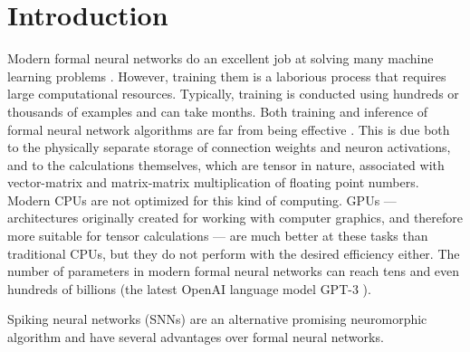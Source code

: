 \documentclass[a4paper]{article}
\begin{document}
\pagebreak

\section*{Introduction}

Modern formal neural networks do an excellent job at solving many machine learning problems \cite{pmlr-v28-wan13, Khan_2020}. However, training them is a laborious process that requires large computational resources. Typically, training is conducted using hundreds or thousands of examples and can take months. Both training and inference of formal neural network algorithms are far from being effective \cite{Edwards2015GrowingPF}. This is due both to the physically separate storage of connection weights and neuron activations, and to the calculations themselves, which are tensor in nature, associated with vector-matrix and matrix-matrix multiplication of floating point numbers. Modern CPUs are not optimized for this kind of computing. GPUs --- architectures originally created for working with computer graphics, and therefore more suitable for tensor calculations --- are much better at these tasks than traditional CPUs, but they do not perform with the desired efficiency either. The number of parameters in modern formal neural networks can reach tens \cite{ManyParams, Khan_2020} and even hundreds of billions (the latest OpenAI language model GPT-3 \cite{brown2020language}).

Spiking neural networks (SNNs) are an alternative promising neuromorphic algorithm and have several advantages over formal neural networks.
\end{document}
